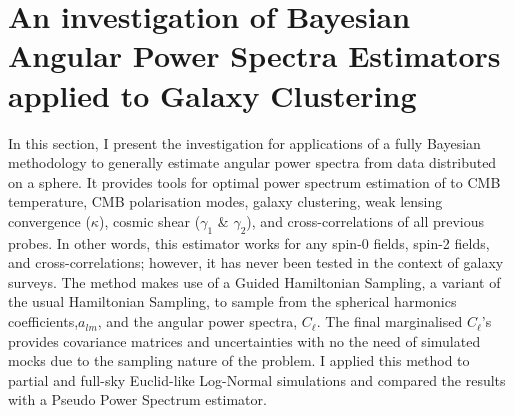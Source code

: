 %
\chapter[An investigation of Bayesian-$C_{\ell}$ Estimators applied to Galaxy Clustering]{An investigation of Bayesian Angular Power Spectra Estimators applied to Galaxy Clustering}\label{Chap:BPL}




In this section, I present the investigation for applications of a fully Bayesian methodology to generally estimate angular power spectra from data distributed on a sphere. It provides tools for optimal power spectrum estimation of to CMB temperature, CMB polarisation modes, galaxy clustering, weak lensing convergence ($\kappa$), cosmic shear ($\gamma_1$ \& $\gamma_2$), and cross-correlations of all previous probes. In other words, this estimator works for any spin-0 fields, spin-2 fields, and cross-correlations; however, it has never been tested in the context of galaxy surveys. The method makes use of a Guided Hamiltonian Sampling, a variant of the usual Hamiltonian Sampling, to sample from the spherical harmonics coefficients,$a_{lm}$, and the angular power spectra, $C_{\ell}$. The final marginalised $C_{\ell}$'s provides covariance matrices and uncertainties with no the need of simulated mocks due to the sampling nature of the problem. I applied this method to partial and full-sky Euclid-like Log-Normal simulations and compared the results with a Pseudo Power Spectrum estimator.

